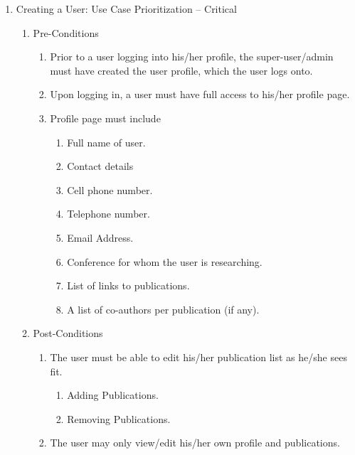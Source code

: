 \documentclass[hidelinks,a4paper,12pt]{article}
\begin{document}
\begin{enumerate}
	\item  Creating a User: Use Case Prioritization -- Critical
	
	\begin{enumerate}
		\item  Pre-Conditions
		
		\begin{enumerate}
			\item  Prior to a user logging into his/her profile, the super-user/admin must have created the user profile, which the user logs onto.
			
			\item  Upon logging in, a user must have full access to his/her profile page.
			
			\item  Profile page must include
			
			\begin{enumerate}
				\item  Full name of user.
				
				\item  Contact details
				
				\item  Cell phone number.
				
				\item  Telephone number.
				
				\item  Email Address.
				
				\item  Conference for whom the user is researching.
				
				\item  List of links to publications.
				
				\item  A list of co-authors per publication (if any).
			\end{enumerate}
		\end{enumerate}
		
		\item  Post-Conditions
		
		\begin{enumerate}
			\item  The user must be able to edit his/her publication list as he/she sees fit.
			
			\begin{enumerate}
				\item  Adding Publications.
				
				\item  Removing Publications.
			\end{enumerate}
			
			\item  The user may only view/edit his/her own profile and publications.
		\end{enumerate}
	\end{enumerate}
\end{enumerate}
\end{document}
